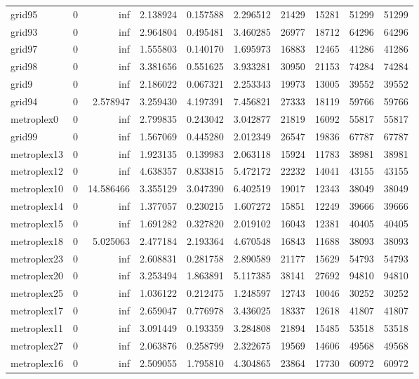 \begin{longtable}{|l|r|r|r|r|r|r|r|r|r|}
grid95 & 0 & inf & 2.138924 & 0.157588 & 2.296512 & 21429 & 15281 & 51299 & 51299 \\
grid93 & 0 & inf & 2.964804 & 0.495481 & 3.460285 & 26977 & 18712 & 64296 & 64296 \\
grid97 & 0 & inf & 1.555803 & 0.140170 & 1.695973 & 16883 & 12465 & 41286 & 41286 \\
grid98 & 0 & inf & 3.381656 & 0.551625 & 3.933281 & 30950 & 21153 & 74284 & 74284 \\
grid9 & 0 & inf & 2.186022 & 0.067321 & 2.253343 & 19973 & 13005 & 39552 & 39552 \\
grid94 & 0 & 2.578947 & 3.259430 & 4.197391 & 7.456821 & 27333 & 18119 & 59766 & 59766 \\
metroplex0 & 0 & inf & 2.799835 & 0.243042 & 3.042877 & 21819 & 16092 & 55817 & 55817 \\
grid99 & 0 & inf & 1.567069 & 0.445280 & 2.012349 & 26547 & 19836 & 67787 & 67787 \\
metroplex13 & 0 & inf & 1.923135 & 0.139983 & 2.063118 & 15924 & 11783 & 38981 & 38981 \\
metroplex12 & 0 & inf & 4.638357 & 0.833815 & 5.472172 & 22232 & 14041 & 43155 & 43155 \\
metroplex10 & 0 & 14.586466 & 3.355129 & 3.047390 & 6.402519 & 19017 & 12343 & 38049 & 38049 \\
metroplex14 & 0 & inf & 1.377057 & 0.230215 & 1.607272 & 15851 & 12249 & 39666 & 39666 \\
metroplex15 & 0 & inf & 1.691282 & 0.327820 & 2.019102 & 16043 & 12381 & 40405 & 40405 \\
metroplex18 & 0 & 5.025063 & 2.477184 & 2.193364 & 4.670548 & 16843 & 11688 & 38093 & 38093 \\
metroplex23 & 0 & inf & 2.608831 & 0.281758 & 2.890589 & 21177 & 15629 & 54793 & 54793 \\
metroplex20 & 0 & inf & 3.253494 & 1.863891 & 5.117385 & 38141 & 27692 & 94810 & 94810 \\
metroplex25 & 0 & inf & 1.036122 & 0.212475 & 1.248597 & 12743 & 10046 & 30252 & 30252 \\
metroplex17 & 0 & inf & 2.659047 & 0.776978 & 3.436025 & 18337 & 12618 & 41807 & 41807 \\
metroplex11 & 0 & inf & 3.091449 & 0.193359 & 3.284808 & 21894 & 15485 & 53518 & 53518 \\
metroplex27 & 0 & inf & 2.063876 & 0.258799 & 2.322675 & 19569 & 14606 & 49568 & 49568 \\
metroplex16 & 0 & inf & 2.509055 & 1.795810 & 4.304865 & 23864 & 17730 & 60972 & 60972 \\

\end{longtable}
